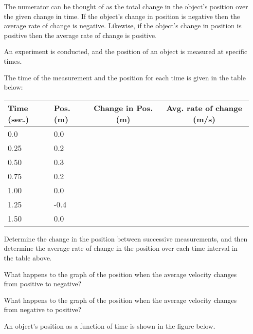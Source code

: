 \begin{problem}
\scalebox{0.5}{}

The numerator can be thought of as the total change in the object's
position over the given change in time. If the object's change in
position is negative then the average rate of change is
negative. Likewise, if the object's change in position is positive
then the average rate of change is positive.

\clearpage


\item An experiment is conducted, and the position of an object is
  measured at specific times.
  \begin{subproblem}
  \item The time of the measurement and the
    position for each time is given in the table below: \\
  \begin{tabular}{l|l|c|c}
    Time (sec.) & Pos. (m) & Change in Pos. (m) & Avg. rate of change (m/s) \\ \hline
    0.0  &  0.0 & \\ [12pt]
    0.25 &  0.2 & \\ [12pt]
    0.50 &  0.3 & \\ [12pt]
    0.75 &  0.2 & \\ [12pt]
    1.00 &  0.0 & \\ [12pt]
    1.25 & -0.4 & \\ [12pt]
    1.50 &  0.0 &
  \end{tabular}

  Determine the change in the position between successive
  measurements, and then determine the average rate of change in the
  position over each time interval in the table above.

  \item What happens to the graph of the position when the average
    velocity changes from positive to negative?
    \vfill

  \item What happens to the graph of the position when the average
    velocity changes from negative to positive?
    \vfill

  \end{subproblem}

  \clearpage

  \item An object's position as a function of time is shown in the
    figure below.

    \scalebox{0.5}{}


\end{problem}

